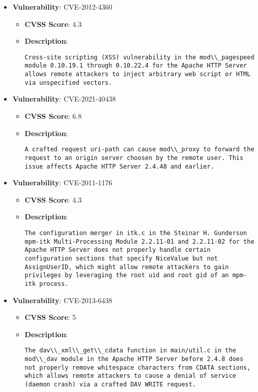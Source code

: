 \documentclass{article}
\begin{document}
\begin{itemize}
        \item \textbf{Vulnerability}: CVE-2012-4360
        \begin{itemize}
            \item \textbf{CVSS Score}:  4.3 
            \item \textbf{Description}:
            \parbox[t]{0.9\linewidth}{
                \verb|Cross-site scripting (XSS) vulnerability in the mod\\_pagespeed module 0.10.19.1 through 0.10.22.4 for the Apache HTTP Server allows remote attackers to inject arbitrary web script or HTML via unspecified vectors.|
            }
        \end{itemize}
    
        \item \textbf{Vulnerability}: CVE-2021-40438
        \begin{itemize}
            \item \textbf{CVSS Score}:  6.8 
            \item \textbf{Description}:
            \parbox[t]{0.9\linewidth}{
                \verb|A crafted request uri-path can cause mod\\_proxy to forward the request to an origin server choosen by the remote user. This issue affects Apache HTTP Server 2.4.48 and earlier.|
            }
        \end{itemize}
    
        \item \textbf{Vulnerability}: CVE-2011-1176
        \begin{itemize}
            \item \textbf{CVSS Score}:  4.3 
            \item \textbf{Description}:
            \parbox[t]{0.9\linewidth}{
                \verb|The configuration merger in itk.c in the Steinar H. Gunderson mpm-itk Multi-Processing Module 2.2.11-01 and 2.2.11-02 for the Apache HTTP Server does not properly handle certain configuration sections that specify NiceValue but not AssignUserID, which might allow remote attackers to gain privileges by leveraging the root uid and root gid of an mpm-itk process.|
            }
        \end{itemize}
    
        \item \textbf{Vulnerability}: CVE-2013-6438
        \begin{itemize}
            \item \textbf{CVSS Score}:  5 
            \item \textbf{Description}:
            \parbox[t]{0.9\linewidth}{
                \verb|The dav\\_xml\\_get\\_cdata function in main/util.c in the mod\\_dav module in the Apache HTTP Server before 2.4.8 does not properly remove whitespace characters from CDATA sections, which allows remote attackers to cause a denial of service (daemon crash) via a crafted DAV WRITE request.|
            }
        \end{itemize}
    

\end{itemize}
\end{document}
